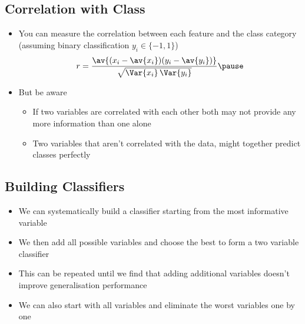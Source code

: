 
\begin{slide}
\section{Correlation with Class}

\begin{PauseHighLight}
  \begin{itemize}
  \item You can measure the correlation between each feature and the
    class category (assuming binary classification $y_i\in\{-1,1\}$)
    \begin{align*}
      r = \frac{\av{ (x_i-\av{x_i}) (y_i - \av{y_i})
      }}{\sqrt{\Var{x_i}\,\Var{y_i}}}\pause
    \end{align*}
  \item But be aware
    \begin{itemize}
    \item If two variables are correlated with each other both may not
      provide any more information than one alone\pause
    \item Two variables that aren't correlated with the data, might
      together predict classes perfectly\pause
    \end{itemize}
  \end{itemize}
\end{PauseHighLight}

\end{slide}


\begin{slide}
\section{Building Classifiers}

\begin{PauseHighLight}
  \begin{itemize}
  \item We can systematically build a classifier starting from the most
    informative variable\pause
  \item We then add all possible variables and choose the best to
    form a two variable classifier\pause
  \item This can be repeated until we find that adding additional
    variables doesn't improve generalisation performance\pause
  \item We can also start with all variables and eliminate the worst
    variables one by one\pause
  \end{itemize}
\end{PauseHighLight}

\end{slide}


